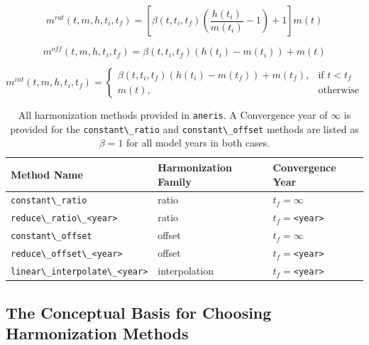 \documentclass[review]{elsarticle}
\newcommand{\code}[1]{\lstinline[basicstyle=\ttfamily\color{black}]|#1|}
\begin{document}
\begin{equation}\label{eqs:ratio}
  m^{rat}(t, m, h, t_i, t_f) = [\beta(t, t_i, t_f) (\frac{h(t_i)}{m(t_i)} - 1) + 1] m(t)
\end{equation}

\begin{equation}\label{eqs:offset}
  m^{off}(t, m, h, t_i, t_f) = \beta(t, t_i, t_f) (h(t_i) - m(t_i)) + m(t)
\end{equation}
  
\begin{equation}\label{eqs:interpolate}
  m^{int}(t, m, h, t_i, t_f) =
  \begin{cases}
    \beta(t, t_i, t_f) (h(t_i) - m(t_f)) + m(t_f), & \text{if } t < t_f\\
    m(t), & \text{otherwise}
  \end{cases}
\end{equation}


\begin{table}[h!]
\centering
\caption{All harmonization methods provided in \code{aneris}. A Convergence year of $\infty$ is provided for the \code{constant\_ratio} and \code{constant\_offset} methods are listed as $\beta = 1$ for all model years in both cases.}
\label{tab:meths}
\begin{tabular}{|l|l|l|}
\hline
Method Name                             & Harmonization Family & Convergence Year\\
\hline
\code{constant\_ratio}                  & ratio              & $t_f = \infty$\\
\code{reduce\_ratio\_<year>}            & ratio              & $t_f = $\code{<year>}\\
\code{constant\_offset}                 & offset             & $t_f = \infty$\\
\code{reduce\_offset\_<year>}           & offset             & $t_f = $\code{<year>}\\
\code{linear\_interpolate\_<year>}      & interpolation      & $t_f = $\code{<year>}\\
\hline
\end{tabular}
\end{table}

\subsection{The Conceptual Basis for Choosing Harmonization Methods}\label{sec:concept}
\end{document}
